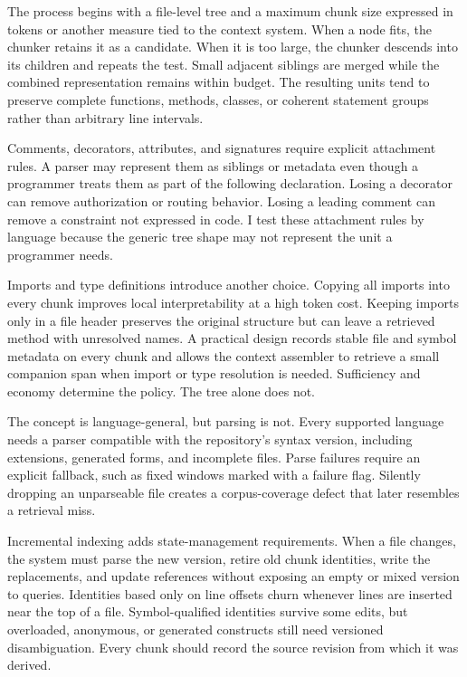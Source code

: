 The process begins with a file-level tree and a maximum chunk size expressed in tokens or another measure tied to the context system. When a node fits, the chunker retains it as a candidate. When it is too large, the chunker descends into its children and repeats the test. Small adjacent siblings are merged while the combined representation remains within budget. The resulting units tend to preserve complete functions, methods, classes, or coherent statement groups rather than arbitrary line intervals.

Comments, decorators, attributes, and signatures require explicit attachment rules. A parser may represent them as siblings or metadata even though a programmer treats them as part of the following declaration. Losing a decorator can remove authorization or routing behavior. Losing a leading comment can remove a constraint not expressed in code. I test these attachment rules by language because the generic tree shape may not represent the unit a programmer needs.

Imports and type definitions introduce another choice. Copying all imports into every chunk improves local interpretability at a high token cost. Keeping imports only in a file header preserves the original structure but can leave a retrieved method with unresolved names. A practical design records stable file and symbol metadata on every chunk and allows the context assembler to retrieve a small companion span when import or type resolution is needed. Sufficiency and economy determine the policy. The tree alone does not.

The concept is language-general, but parsing is not. Every supported language needs a parser compatible with the repository's syntax version, including extensions, generated forms, and incomplete files. Parse failures require an explicit fallback, such as fixed windows marked with a failure flag. Silently dropping an unparseable file creates a corpus-coverage defect that later resembles a retrieval miss.

Incremental indexing adds state-management requirements. When a file changes, the system must parse the new version, retire old chunk identities, write the replacements, and update references without exposing an empty or mixed version to queries. Identities based only on line offsets churn whenever lines are inserted near the top of a file. Symbol-qualified identities survive some edits, but overloaded, anonymous, or generated constructs still need versioned disambiguation. Every chunk should record the source revision from which it was derived.

